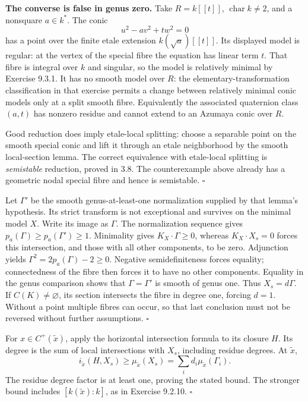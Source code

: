 \documentclass[11pt]{article}
\let\chapterexercise\exercise
\renewcommand{\exercise}[2]{\Needspace{8\baselineskip}\chapterexercise{#1}{#2}}
\begin{document}
\pf \textbf{The converse is false in genus zero.} Take $R=k[[t]]$, $\operatorname{char}k\ne2$, and a nonsquare $a\in k^*$. The conic
\[ u^2-av^2+tw^2=0 \]
has a point over the finite etale extension $k(\sqrt a)[[t]]$. Its displayed model is regular: at the vertex of the special fibre the equation has linear term $t$. That fibre is integral over $k$ and singular, so the model is relatively minimal by Exercise 9.3.1. It has no smooth model over $R$: the elementary-transformation classification in that exercise permits a change between relatively minimal conic models only at a split smooth fibre. Equivalently the associated quaternion class $(a,t)$ has nonzero residue and cannot extend to an Azumaya conic over $R$.

Good reduction does imply etale-local splitting: choose a separable point on the smooth special conic and lift it through an etale neighborhood by the smooth local-section lemma. The correct equivalence with etale-local splitting is \emph{semistable} reduction, proved in 3.8. The counterexample above already has a geometric nodal special fibre and hence is semistable. \hfill$\square$

\pf Let $\Gamma'$ be the smooth genus-at-least-one normalization supplied by that lemma's hypothesis. Its strict transform is not exceptional and survives on the minimal model $X$. Write its image as $\Gamma$. The normalization sequence gives $p_a(\Gamma)\ge p_a(\Gamma')\ge1$. Minimality gives $K_X\cdot\Gamma\ge0$, whereas $K_X\cdot X_s=0$ forces this intersection, and those with all other components, to be zero. Adjunction yields $\Gamma^2=2p_a(\Gamma)-2\ge0$. Negative semidefiniteness forces equality; connectedness of the fibre then forces it to have no other components. Equality in the genus comparison shows that $\Gamma=\Gamma'$ is smooth of genus one. Thus $X_s=d\Gamma$. If $C(K)\ne\varnothing$, its section intersects the fibre in degree one, forcing $d=1$. Without a point multiple fibres can occur, so that last conclusion must not be reversed without further assumptions. \hfill$\square$

\pf For $x\in C^+(\widetilde x)$, apply the horizontal intersection formula to its closure $H$. Its degree is the sum of local intersections with $X_s$, including residue degrees. At $\widetilde x$,
\[ i_{\widetilde x}(H,X_s)\ge\mu_{\widetilde x}(X_s)
=\sum_i d_i\mu_{\widetilde x}(\Gamma_i). \]
The residue degree factor is at least one, proving the stated bound. The stronger bound includes $[k(\widetilde x):k]$, as in Exercise 9.2.10. \hfill$\square$
\end{document}

